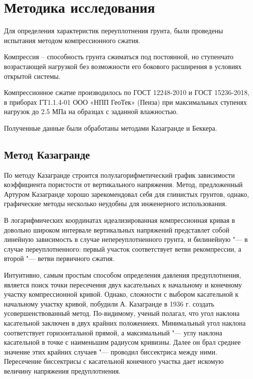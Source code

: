 \chapter{Методика исследования}

Для определения характеристик переуплотнения грунта, были проведены испытания методом компрессионного сжатия. 

Компрессия – способность грунта сжиматься под постоянной, но ступенчато возрастающей нагрузкой без возможности его бокового расширения в условиях открытой системы.

Компрессионное сжатие производилось по ГОСТ 12248-2010 и ГОСТ 15236-2018, в приборах ГТ1.1.4-01 ООО «НПП ГеоТек» (Пенза) при максимальных ступенях нагрузок до 2.5 МПа на образцах с заданной влажностью. 

Полученные данные были обработаны методами Казагранде и Беккера. 

\section{Метод Казагранде}

По методу Казагранде строится полулагорифметический график зависимости коэффициента пористости от вертикального напряжения.  
Метод, предложенный Артуром Казагранде хорошо зарекомендовал себя для глинистых грунтов, однако, графические методы несколько неудобны для инженерного использования.

В логарифмических координатах идеализированная компрессионная кривая в довольно широком интервале вертикальных напряжений представлет собой линейную зависимость в случае непереуплотненного грунта, и билинейную "--- в случае переуплотненного:
первый участок соответствует ветви рекомпрессии, а второй "--- ветви первичного сжатия.

Интуитивно, самым простым способом определения давления предуплотнения, является поиск точки пересечения двух касательных к начальному и конечному участку компрессионной кривой. 
Однако, сложности с выбором касательной к начальному участку кривой, побудили А. Казагранде в 1936 г. создать усовершенствованный метод. 
По-видимому, ученый полагал, что угол наклона касательной заключен в двух крайних положениеях. 
Минимальный угол наклона соответствует горизонтальной прямой, а максимальный "--- углу наклона касательной в точке с наименьшим радиусом кривизны. 
Далее он брал среднее значение этих крайних случаев "--- проводил биссектриса между ними. 
Пересечение биссектрисы с касательной конечного участка дает искомую величину напряжения предуплотнения.


